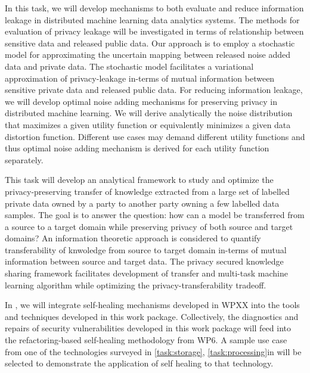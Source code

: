 \begin{Workpackage}{\thewpno}
\begin{Task}
  \TaskResults{%
  }
  \TaskHeader{}
  In this task, we will develop mechanisms to both evaluate and reduce information leakage in distributed machine learning data analytics systems. The methods for evaluation of privacy leakage will be investigated in terms of relationship between sensitive data and released public data. Our approach is to employ a stochastic model for approximating the uncertain mapping between released noise added data and private data. The stochastic model facilitates a variational approximation of privacy-leakage in-terms of mutual information between sensitive private data and released public data. For reducing information leakage, we will develop optimal noise adding mechanisms for preserving privacy in distributed machine learning. We will derive analytically the noise distribution that maximizes a given utility function or equivalently minimizes a given data distortion function. Different use cases may demand different utility functions and thus optimal noise adding mechanism is derived for each utility function separately.  
 \end{Task}

 \begin{Task}
  
  \TaskResults{%
  }
  \TaskHeader{}
  This task will develop an analytical framework to study and optimize the privacy-preserving transfer of knowledge extracted from a large set of labelled private data owned by a party to another party owning a few labelled data samples. The goal is to answer the question: how can a model be transferred from a source to a target domain while preserving privacy of both source and target domains? An information theoretic approach is considered to quantify transferability of knwoledge from source to target domain in-terms of mutual information between source and target data. The privacy secured knowledge sharing framework facilitates development of transfer and multi-task machine learning algorithm while optimizing the privacy-transferability tradeoff.
 \end{Task}

 \begin{Task}
  
  \TaskResults{%
  }
  \TaskHeader{}
  In \theTask, we will integrate self-healing mechanisms developed in WPXX into the tools and techniques developed in this work package. Collectively, the diagnostics and repairs of security vulnerabilities developed in this work package will feed into the refactoring-based self-healing methodology from WP6. A sample use case from one of the technologies surveyed in \ref{task:storage}, \ref{task:processing}in  will be selected to demonstrate the application of self healing to that technology. 
 \end{Task}


\end{Workpackage}
